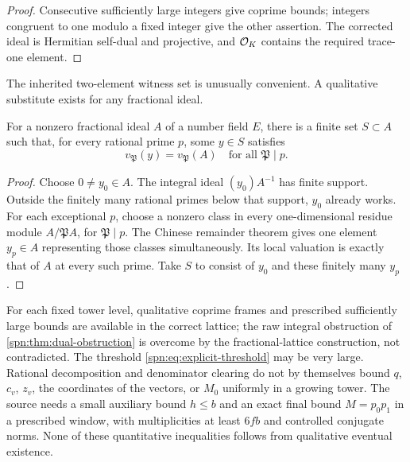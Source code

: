 \begin{proof}
Consecutive sufficiently large integers give coprime bounds; integers
congruent to one modulo a fixed integer give the other assertion. The
corrected ideal is Hermitian self-dual and projective, and $\mathcal{O}_K$ contains
the required trace-one element.
\end{proof}

The inherited two-element witness set is unusually convenient. A qualitative
substitute exists for any fractional ideal.

\begin{lemma}\label{spn:lem:local-generators}
For a nonzero fractional ideal $A$ of a number field $E$, there is a finite
set $S\subset A$ such that, for every rational prime $p$, some $y\in S$
satisfies
\[
 v_{\mathfrak P}(y)=v_{\mathfrak P}(A)\quad\text{for all }\mathfrak P\mid p .
\]
\end{lemma}

\begin{proof}
Choose $0\ne y_0\in A$. The integral ideal $(y_0)A^{-1}$ has finite support.
Outside the finitely many rational primes below that support, $y_0$ already
works. For each exceptional $p$, choose a nonzero class in every
one-dimensional residue module $A/\mathfrak PA$, for $\mathfrak P\mid p$. The
Chinese remainder theorem gives one element $y_p\in A$ representing those
classes simultaneously. Its local valuation is exactly that of $A$ at every
such prime. Take $S$ to consist of $y_0$ and these finitely many $y_p$.
\end{proof}

\begin{remark}\label{spn:rem:projective-limits}
For each fixed tower level, qualitative coprime frames and prescribed
sufficiently large bounds are available in the correct lattice; the raw
integral obstruction of \cref{spn:thm:dual-obstruction} is overcome by the
fractional-lattice construction, not contradicted. The threshold
\eqref{spn:eq:explicit-threshold} may be very large. Rational decomposition
and denominator clearing do not by themselves bound $q$, $c_v$, $z_v$, the
coordinates of the vectors, or $M_0$ uniformly in a growing tower. The source
needs a small auxiliary bound $h\le b$ and an exact final bound $M=p_0p_1$ in
a prescribed window, with multiplicities at least $6fb$ and controlled
conjugate norms. None of these quantitative inequalities follows from
qualitative eventual existence.
\end{remark}

